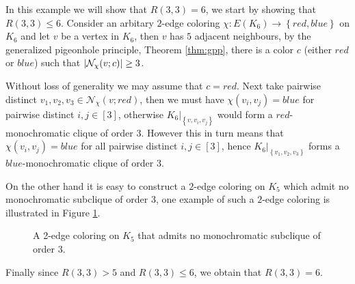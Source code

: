 \begin{example}\label{exmp:R3_3}
	In this example we will show that $R(3, 3) = 6$, we start by showing that $R(3, 3) \leq 6$. Consider an arbitary $2$-edge coloring $\chi: E(K_{6}) \to \left\{red, blue\right\}$ on $K_6$ and let $v$ be a vertex in $K_6$, then $v$ has $5$ adjacent neighbours, by the generalized pigeonhole principle, Theorem \ref{thm:gpp}, there is a color $c$ (either $red$ or $blue$) such that $\left\lvert\mathcal{N}_{\chi}(v; c)\right\rvert \geq 3$.

	Without loss of generality we may assume that $c = red$. Next take pairwise distinct $v_1, v_2, v_3 \in \mathcal{N}_{\chi}(v; red)$, then we must have $\chi(v_{i}, v_{j}) = blue$ for pairwise distinct $i, j \in [3]$, otherwise $K_{6} |_{\left\{v, v_i, v_j\right\}}$ would form a $red$-monochromatic clique of order $3$. However this in turn means that $\chi(v_i, v_j) = blue$ for all pairwise distinct $i, j \in [3]$, hence $K_6 |_{\left\{v_1, v_2, v_3\right\}}$ forms a $blue$-monochromatic clique of order $3$.

	On the other hand it is easy to construct a $2$-edge coloring on $K_5$ which admit no monochromatic subclique of order $3$, one example of such a $2$-edge coloring is illustrated in Figure \ref{fig:K5_counter_example}.
	\begin{figure}[H]
		\centering
		\caption{A 2-edge coloring on $K_{5}$ that admits no monochromatic subclique of order $3$.}
		\label{fig:K5_counter_example}
	\end{figure}
	Finally since $R(3, 3) > 5$ and $R(3, 3) \leq 6$, we obtain that $R(3, 3) = 6$.
\end{example}
\newpage

